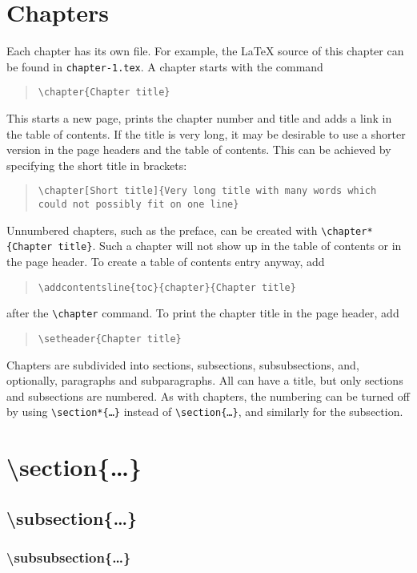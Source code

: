 \section{Chapters}

Each chapter has its own file. For example, the \LaTeX{} source of this chapter can be found in \texttt{chapter-1.tex}. A chapter starts with the command
\begin{quote}
    \texttt{\textbackslash chapter\{Chapter title\}}
\end{quote}
This starts a new page, prints the chapter number and title and adds a link in the table of contents. If the title is very long, it may be desirable to use a shorter version in the page headers and the table of contents. This can be achieved by specifying the short title in brackets:
\begin{quote}
    \texttt{\textbackslash chapter[Short title]\{Very long title with many words which could not possibly fit on one line\}}
\end{quote}
Unnumbered chapters, such as the preface, can be created with \texttt{\textbackslash chapter*\{Chapter title\}}. Such a chapter will not show up in the table of contents or in the page header. To create a table of contents entry anyway, add
\begin{quote}
    \texttt{\textbackslash addcontentsline\{toc\}\{chapter\}\{Chapter title\}}
\end{quote}
after the \texttt{\textbackslash chapter} command. To print the chapter title in the page header, add
\begin{quote}
    \texttt{\textbackslash setheader\{Chapter title\}}
\end{quote}

Chapters are subdivided into sections, subsections, subsubsections, and, optionally, paragraphs and subparagraphs. All can have a title, but only sections and subsections are numbered. As with chapters, the numbering can be turned off by using \texttt{\textbackslash section*\{\ldots\}} instead of \texttt{\textbackslash section\{\ldots\}}, and similarly for the subsection.
\section{\textbackslash section\{\ldots\}}
\subsection{\textbackslash subsection\{\ldots\}}
\subsubsection{\textbackslash subsubsection\{\ldots\}}
